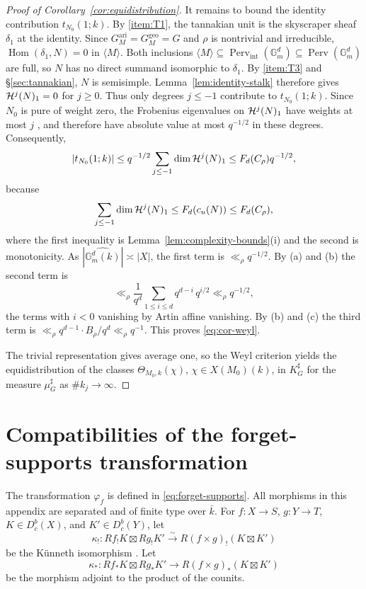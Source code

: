 \documentclass[12pt,reqno]{amsart}
\theoremstyle{definition}
\theoremstyle{plain}
\theoremstyle{definition}
\theoremstyle{remark}
\newcommand{\bbG}{\mathbb{G}}  \newcommand{\bbH}{\mathbb{H}}
\newcommand{\Db}{D^b_c}
\newcommand{\Gm}{\bbG_m}
\newcommand{\Perv}{\operatorname{Perv}}
\newcommand{\cu}{c_u}
\begin{document}
\begin{proof}[Proof of Corollary~\ref{cor:equidistribution}]
It remains to bound the identity contribution \(t_{N_0}(1;k)\).  By \ref{item:T1}, the tannakian unit is
the skyscraper sheaf \(\delta_1\) at the identity.  Since
\(G^{\mathrm{ari}}_M=G^{\mathrm{geo}}_M=G\) and \(\rho\) is nontrivial and irreducible,
\(\operatorname{Hom}(\delta_1,N)=0\) in \(\langle M\rangle\).  Both inclusions
\(\langle M\rangle\subseteq\Perv_{\mathrm{int}}(\Gm^d)\subseteq\Perv(\Gm^d)\) are full, so \(N\) has no
direct summand isomorphic to \(\delta_1\).  By \ref{item:T3} and \S\ref{sec:tannakian}, \(N\) is semisimple.
Lemma~\ref{lem:identity-stalk} therefore gives \(\mathcal{H}^j(N)_1=0\) for \(j\ge0\).  Thus only
degrees \(j\le-1\) contribute to \(t_{N_0}(1;k)\).  Since \(N_0\) is pure of weight zero, the Frobenius
eigenvalues on \(\mathcal{H}^j(N)_1\) have weights at most \(j\) \cite[1.2]{Del80}, \cite[5.1.8]{BBDG18} and
therefore have absolute value at most \(q^{-1/2}\) in these degrees.  Consequently,
\[
        |t_{N_0}(1;k)|
        \le q^{-1/2}\sum_{j\le-1}\dim\mathcal{H}^j(N)_1
        \le F_{d}(C_\rho)q^{-1/2},
\]
because
\[
 \sum_{j\le-1}\dim\cH^j(N)_1
 \le F_{d}(\cu(N))
 \le F_{d}(C_\rho),
\]
where the first inequality is Lemma~\ref{lem:complexity-bounds}(i) and the second is monotonicity.  As
\(|\widehat{\Gm^d(k)}|\asymp|X|\), the first term is \(\ll_\rho q^{-1/2}\).  By (a) and (b) the
second term is
\[
        \ll_\rho\frac{1}{q^d}\sum_{1\le i\le d}q^{d-i}\,q^{i/2}\ll_\rho q^{-1/2},
\]
the terms with \(i<0\) vanishing by Artin affine vanishing.  By (b) and (c) the third
term is \(\ll_\rho q^{d-1}\cdot B_\rho/q^d\ll_\rho q^{-1}\).  This proves \eqref{eq:cor-weyl}.

The trivial representation gives average one, so the Weyl criterion yields the equidistribution of the
classes \(\Theta_{M_0,k}(\chi)\), \(\chi\in X(M_0)(k)\), in \(K_G^\sharp\) for the measure
\(\mu_G^\sharp\) as \(\#k_j\to\infty\).
\end{proof}


\appendix

\section{Compatibilities of the forget-supports transformation}
\label{app:forget-supports}

The transformation \(\varphi_f\) is defined in \eqref{eq:forget-supports}.
All morphisms in this appendix are separated and of finite type over \(\bar k\).  For
\(f:X\to S\), \(g:Y\to T\), \(K\in\Db(X)\), and \(K'\in\Db(Y)\), let
\[
 \kappa_!:Rf_!K\boxtimes Rg_!K'\xrightarrow{\sim}R(f\times g)_!(K\boxtimes K')
\]
be the K\"unneth isomorphism \cite[Exp.~XVII, Th.~5.4.3]{SGA4}.  Let
\[
 \kappa_*:Rf_*K\boxtimes Rg_*K'\longrightarrow R(f\times g)_*(K\boxtimes K')
\]
be the morphism adjoint to the product of the counits.
\end{document}
